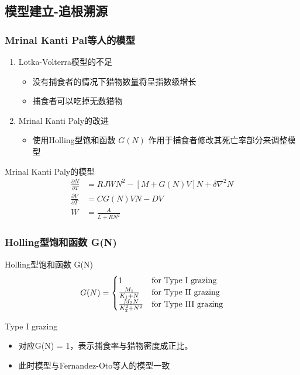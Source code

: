 \documentclass[aspectratio=169, 12pt, utf8, mathserif]{ctexbeamer} %
\begin{document}
\subsection{模型建立-追根溯源}	
\begin{frame}
	\frametitle{Mrinal Kanti Pal等人的模型}
	\begin{enumerate}
		\item Lotka-Volterra模型的不足
		\begin{itemize}
			\item 没有捕食者的情况下猎物数量将呈指数级增长
			\item 捕食者可以吃掉无数猎物
		\end{itemize}
		
		\item Mrinal Kanti Paly的改进 
		\begin{itemize}
			\item 使用Holling型饱和函数 $G(N)$ 作用于捕食者修改其死亡率部分来调整模型 
		\end{itemize}
	\end{enumerate}
	
	\begin{exampleblock}{Mrinal Kanti Paly的模型}
		\begin{align}
			\frac{\partial N}{\partial T} &= RJWN^2 - [M + G(N)V]N + \delta\nabla^2N \tag{1} \\
			\frac{\partial V}{\partial T} &= CG(N)VN - DV \tag{2} \\
			W &= \frac{A}{L+RN^2} \tag{3}
		\end{align}
	\end{exampleblock}
\end{frame}




\begin{frame}
	\frametitle{Holling型饱和函数 G(N)}
	\begin{exampleblock}{Holling型饱和函数 G(N)\cite{[4]}}
		\begin{align}
			G(N) =
			\begin{cases}
				1 & \text{for Type I grazing} \\
				\frac{M_1}{K_1 + N} & \text{for Type II grazing} \\
				\frac{M_2N}{K_2^2 + N^2} & \text{for Type III grazing}
			\end{cases} \notag
		\end{align}
	\end{exampleblock}
		
		
	\begin{exampleblock}{Type I grazing}
	  \begin{itemize}
		\item 对应G(N) = 1，表示捕食率与猎物密度成正比。
		\item 此时模型与Fernandez-Oto等人的模型一致
		
	\end{itemize}
	\end{exampleblock}
\end{frame}
\end{document}
